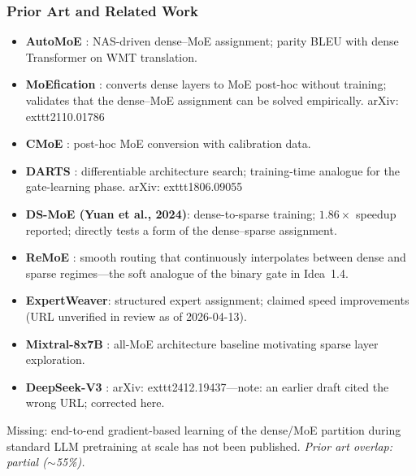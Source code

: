 \documentclass[11pt]{article}
\begin{document}
\subsubsection*{Prior Art and Related Work}
\begin{itemize}
  \item \textbf{AutoMoE} \cite{JawaharEtAl2023}: NAS-driven dense--MoE assignment; parity BLEU with dense Transformer on WMT translation.

  \item \textbf{MoEfication} \cite{ZhangEtAl2022MoEfication}: converts dense layers to MoE post-hoc without training; validates that the dense--MoE assignment can be solved empirically.
    arXiv:	exttt{2110.01786}

  \item \textbf{CMoE} \cite{CMoERef}: post-hoc MoE conversion with calibration data.

  \item \textbf{DARTS} \cite{LiuSiEtAl2019}: differentiable architecture search; training-time analogue for the gate-learning phase.
    arXiv:	exttt{1806.09055}

  \item \textbf{DS-MoE (Yuan et al., 2024)}: dense-to-sparse training; $1.86\times$ speedup reported; directly tests a form of the dense--sparse assignment.

  \item \textbf{ReMoE} \cite{WangZhuEtAl2024}: smooth routing that continuously interpolates between dense and sparse regimes---the soft analogue of the binary gate in Idea~1.4.

  \item \textbf{ExpertWeaver}: structured expert assignment; claimed speed improvements (URL unverified in review as of 2026-04-13).

  \item \textbf{Mixtral-8x7B} \cite{MistralAI2024}: all-MoE architecture baseline motivating sparse layer exploration.

  \item \textbf{DeepSeek-V3} \cite{DeepSeekAI2024}: arXiv:	exttt{2412.19437}---note: an earlier draft cited the wrong URL; corrected here.
\end{itemize}

\noindent
Missing: end-to-end gradient-based learning of the dense/MoE partition during standard LLM pretraining at scale has not been published.
\emph{Prior art overlap: partial ($\sim$55\%).}
\end{document}
